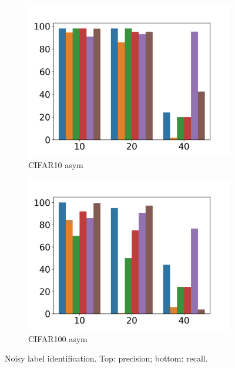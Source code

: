 \documentclass{article}
\begin{document}
\begin{figure}[h]
\begin{subfigure}[b]{0.22\textwidth}
        \includegraphics[width=\textwidth]{figs/c10arbar.png}
        \vspace{-.5cm}
        \caption{CIFAR10 asym}
    \end{subfigure}
    \begin{subfigure}[b]{0.22\textwidth}
        \includegraphics[width=\textwidth]{figs/c100arbar.png}
        \vspace{-.5cm}
        \caption{CIFAR100 asym}
    \end{subfigure}
    \caption[Estimation]{Noisy label identification. Top: precision; bottom: recall.}
    \label{fig:precisionrecallfig}
\end{figure}
\end{document}

